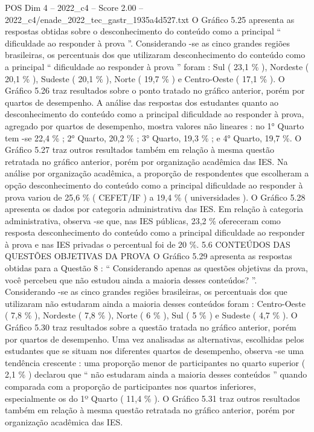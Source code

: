 \begin{textsample}{POS Dim 4 – 2022\_c4 – Score 2.00 – 2022\_c4/enade\_2022\_tec\_gastr\_1935a4d527.txt}
O Gráfico 5.25 apresenta as respostas obtidas sobre o desconhecimento do conteúdo como a principal “ dificuldade ao responder à prova ”.
Considerando -se as cinco grandes regiões brasileiras, os percentuais dos que utilizaram desconhecimento do conteúdo como a principal “ dificuldade ao responder à prova ” foram : Sul ( 23,1 \% ), Nordeste ( 20,1 \% ), Sudeste ( 20,1 \% ), Norte ( 19,7 \% ) e Centro-Oeste ( 17,1 \% ).
O Gráfico 5.26 traz resultados sobre o ponto tratado no gráfico anterior, porém por quartos de desempenho.
A análise das respostas dos estudantes quanto ao desconhecimento do conteúdo como a principal dificuldade ao responder à prova, agregado por quartos de desempenho, mostra valores não lineares : no 1{\EmojiFont °} Quarto tem -se 22,4 \% ; 2{\EmojiFont °} Quarto, 20,2 \% ; 3{\EmojiFont °} Quarto, 19,3 \% ; e 4{\EmojiFont °} Quarto, 19,7 \%.
O Gráfico 5.27 traz outros resultados também em relação à mesma questão retratada no gráfico anterior, porém por organização acadêmica das IES.
Na análise por organização acadêmica, a proporção de respondentes que escolheram a opção desconhecimento do conteúdo como a principal dificuldade ao responder à prova variou de 25,6 \% ( CEFET/IF ) a 19,4 \% ( universidades ).
O Gráfico 5.28 apresenta os dados por categoria administrativa das IES.
Em relação à categoria administrativa, observa -se que, nas IES públicas, 23,2 \% ofereceram como resposta desconhecimento do conteúdo como a principal dificuldade ao responder à prova e nas IES privadas o percentual foi de 20 \%. 5.6 CONTEÚDOS DAS QUESTÕES OBJETIVAS DA PROVA O Gráfico 5.29 apresenta as respostas obtidas para a Questão 8 : “ Considerando apenas as questões objetivas da prova, você percebeu que não estudou ainda a maioria desses conteúdos? ”.
Considerando -se as cinco grandes regiões brasileiras, os percentuais dos que utilizaram não estudaram ainda a maioria desses conteúdos foram : Centro-Oeste ( 7,8 \% ), Nordeste ( 7,8 \% ), Norte ( 6 \% ), Sul ( 5 \% ) e Sudeste ( 4,7 \% ).
O Gráfico 5.30 traz resultados sobre a questão tratada no gráfico anterior, porém por quartos de desempenho.
Uma vez analisadas as alternativas, escolhidas pelos estudantes que se situam nos diferentes quartos de desempenho, observa -se uma tendência crescente : uma proporção menor de participantes no quarto superior ( 2,1 \% ) declarou que “ não estudaram ainda a maioria desses conteúdos ” quando comparada com a proporção de participantes nos quartos inferiores, especialmente os do 1º Quarto ( 11,4 \% ).
O Gráfico 5.31 traz outros resultados também em relação à mesma questão retratada no gráfico anterior, porém por organização acadêmica das IES.

\end{textsample}
